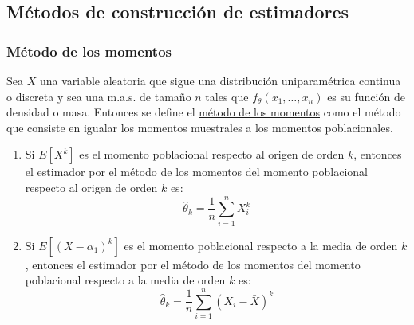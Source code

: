 
\subsection{Métodos de construcción de estimadores}
\subsubsection{Método de los momentos}
\begin{definición}
  Sea $X$ una variable aleatoria que sigue una distribución uniparamétrica continua o discreta y sea una m.a.s. de tamaño $n$ tales que $f_{\theta}(x_1, \ldots, x_n)$ es su función de densidad o masa. Entonces se define el \underline{método de los momentos} como el método que consiste en igualar los momentos muestrales a los momentos poblacionales.
  \begin{enumerate}
    \item Si $E\left[X^{k}\right]$ es el momento poblacional respecto al origen de orden $k$, entonces el estimador por el método de los momentos del momento poblacional respecto al origen de orden $k$ es:
    $$\hat{\theta}_{k}=\frac{1}{n} \sum_{i=1}^{n} X_{i}^{k}$$
    \item Si $E\left[\left(X-\alpha_{1}\right)^{k}\right]$ es el momento poblacional respecto a la media de orden $k$, entonces el estimador por el método de los momentos del momento poblacional respecto a la media de orden $k$ es:
    $$\hat{\theta}_{k}=\frac{1}{n} \sum_{i=1}^{n}\left(X_{i}-\bar{X}\right)^{k}$$
  \end{enumerate}
\end{definición}

